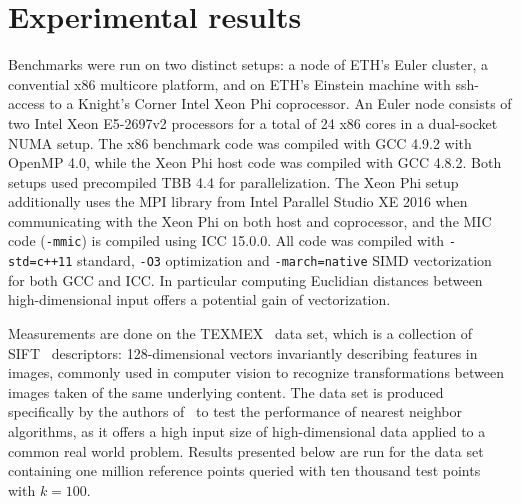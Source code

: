 \section{Experimental results}\sloppy
\label{sec:exp}


Benchmarks were run on two distinct setups: a node of ETH's Euler cluster, a convential x86 multicore platform, and on ETH's Einstein machine with ssh-access to a Knight's Corner Intel Xeon Phi coprocessor. An Euler node consists of two Intel Xeon E5-2697v2 processors for a total of 24 x86 cores in a dual-socket NUMA setup. The x86 benchmark code was compiled with GCC 4.9.2 with OpenMP 4.0, while the Xeon Phi host code was compiled with GCC 4.8.2. Both setups used precompiled TBB 4.4 for
parallelization. The Xeon
Phi setup additionally uses the MPI library from Intel Parallel Studio XE 2016 when communicating with the Xeon Phi on both host and coprocessor, and the MIC code (\texttt{-mmic}) is compiled using ICC 15.0.0. All code was compiled with \texttt{-std=c++11} standard, \texttt{-O3} optimization and \texttt{-march=native} SIMD vectorization for both GCC and ICC. In particular computing Euclidian distances between high-dimensional input offers a potential gain of
vectorization. 

Measurements are done on the TEXMEX~\cite{jegou2011} data set, which is a collection of SIFT~\cite{lowe1999a,lowe2004a} descriptors: 128-dimensional vectors invariantly describing features in images, commonly used in computer vision to recognize transformations between images taken of the same underlying content. The data set is produced specifically by the authors of~\cite{jegou2011} to test the performance of nearest neighbor algorithms, as it offers a high input size of
high-dimensional data applied to a common real world problem. Results presented below are run for the data set containing one million reference points queried with ten thousand test points with $k=100$.  

